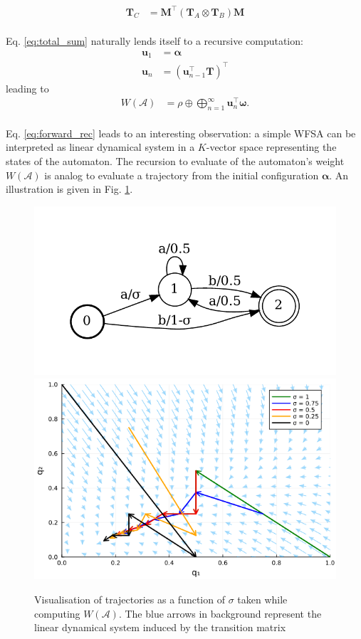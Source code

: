 \begin{align}
    \mathbf{T}_C &= \mathbf{M}^\top (\mathbf{T}_A \otimes \mathbf{T}_B) \mathbf{M}
\end{align}


\paragraph{} Eq. \eqref{eq:total_sum} naturally lends itself to a recursive computation: 
\begin{align}
    \mathbf{u}_1 &= \boldsymbol{\alpha} \\
    \mathbf{u}_n &= (\mathbf{u}_{n-1}^\top \mathbf{T})^\top \label{eq:forward_rec}
\end{align}
leading to 
\begin{align}
    W(\mathcal{A}) &= \rho \oplus \bigoplus_{n=1}^\infty \mathbf{u}_n^\top \boldsymbol{\omega}.
\end{align}

\paragraph{} Eq. \eqref{eq:forward_rec} leads to an interesting observation: a simple WFSA can be interpreted as linear dynamical system in a $K$-vector space representing the states of the automaton. The recursion to evaluate of the automaton's weight $W(\mathcal{A})$ is analog to evaluate a trajectory from the initial configuration $\boldsymbol{\alpha}$. An illustration is given in Fig. \ref{fig:ldyn_wfsa}.
%
\begin{figure}[t] 
    \centering 
        {\includegraphics[width=0.49\linewidth]{images/swfsa.pdf}}
        {\includegraphics[width=0.49\linewidth]{images/dyn_system.png}}
    \caption{Visualisation of trajectories as a function of $\sigma$ taken while computing $W(\mathcal{A})$. The blue arrows in background represent the linear dynamical system induced by the transition matrix}
    \label{fig:ldyn_wfsa}
\end{figure}

